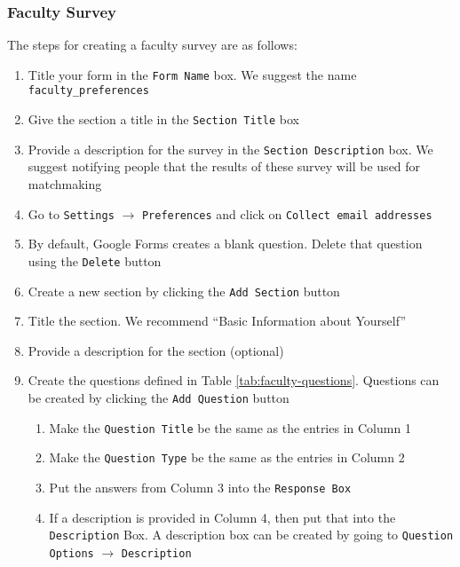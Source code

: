 %
%
\subsubsection{Faculty Survey}

The steps for creating a faculty survey are as follows:
\begin{enumerate}
	\item Title your form in the \texttt{Form Name} box. We suggest the name \texttt{faculty\_preferences}
	\item Give the section a title in the \texttt{Section Title} box
	\item Provide a description for the survey in the \texttt{Section Description} box.
			We suggest notifying people that the results of these survey will be used for matchmaking
	\item Go to \texttt{Settings} $\rightarrow$ \texttt{Preferences} and click on \texttt{Collect email addresses}
	\item By default, Google Forms creates a blank question.  Delete that question using the \texttt{Delete} button
	
	\item Create a new section by clicking the \texttt{Add Section} button
	\item Title the section.  We recommend ``Basic Information about Yourself''
	\item Provide a description for the section (optional)
	\item Create the questions defined in Table \ref{tab:faculty-questions}.  Questions can be created by clicking the \texttt{Add Question} button
		\begin{enumerate}
			\item Make the \texttt{Question Title} be the same as the entries in Column 1
			\item Make the \texttt{Question Type} be the same as the entries in Column 2
			\item Put the answers from Column 3 into the \texttt{Response Box}
			\item If a description is provided in Column 4, then put that into the \texttt{Description} Box. A description box can be created by going to \texttt{Question Options} $\rightarrow$ \texttt{Description}			
		\end{enumerate}
		
	\begin{table}
		\centering
		\begin{tabular}{| l | l | l | p{2in} |}
		

\end{tabular}
\end{table}
\end{enumerate}
